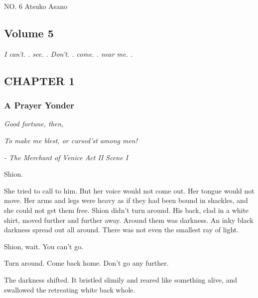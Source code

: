\protect\hypertarget{titlepage.xhtml}{}{}

\protect\hypertarget{index_split_000.html}{}{}

NO. 6 \textbar{} Atsuko Asano

\protect\hypertarget{index_split_001_split_002.html}{}{}

\hypertarget{index_split_001_split_002.htmlux5cux23calibre_pb_0}{%
\subsection{Volume
5}\label{index_split_001_split_002.htmlux5cux23calibre_pb_0}}

\emph{I can't. . see. . Don't. . come. . near me. .}

\hypertarget{index_split_001_split_002.htmlux5cux23calibre_pb_1}{}

\hypertarget{index_split_001_split_002.htmlux5cux23calibre_pb_0}{}

\hypertarget{index_split_001_split_002.htmlux5cux23calibre_toc_2}{%
\subsection{CHAPTER
1}\label{index_split_001_split_002.htmlux5cux23calibre_toc_2}}

\subsubsection{A Prayer Yonder}

\emph{Good fortune, then,}

\emph{To make me blest, or cursed'st among men!}

\emph{- The Merchant of Venice Act II Scene I~}

Shion.

She tried to call to him. But her voice would not come out. Her tongue
would not move. Her arms and legs were heavy as if they had been bound
in shackles, and she could not get them free. Shion didn't turn around.
His back, clad in a white shirt, moved further and further away. Around
them was darkness. An inky black darkness spread out all around. There
was not even the smallest ray of light.

Shion, wait. You can't go.

Turn around. Come back home. Don't go any further.

The darkness shifted. It bristled slimily and reared like something
alive, and swallowed the retreating white back whole.

